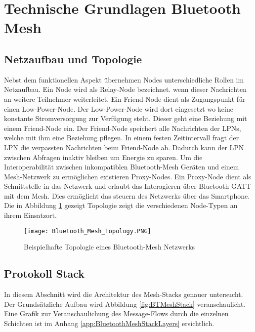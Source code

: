 \clearpage
\section{Technische Grundlagen Bluetooth Mesh}\label{sec:TechnischeGrundlagenBluetoothMesh}




\subsection{Netzaufbau und Topologie}\label{sec:NetzaufbauundTopologie}

Nebst dem funktionellen Aspekt übernehmen Nodes unterschiedliche Rollen im Netzaufbau. Ein Node wird als Relay-Node bezeichnet. wenn dieser Nachrichten an weitere Teilnehmer weiterleitet. Ein Friend-Node dient als Zugangspunkt für einen Low-Power-Node. Der Low-Power-Node wird dort eingesetzt wo keine konstante Stromversorgung zur Verfügung steht. Dieser geht eine Beziehung mit einem Friend-Node ein. Der Friend-Node speichert alle Nachrichten der LPNs, welche mit ihm eine Beziehung pflegen. In einem festen Zeitintervall fragt der LPN die verpassten Nachrichten beim Friend-Node ab. Dadurch kann der LPN zwischen Abfragen inaktiv bleiben um Energie zu sparen. Um die Interoperabilität zwischen inkompatiblen Bluetooth-Mesh Geräten und einem Mesh-Netzwerk zu ermöglichen existieren Proxy-Nodes. Ein Proxy-Node dient als Schnittstelle in das Netzwerk und erlaubt das Interagieren über Bluetooth-GATT mit dem Mesh. Dies ermöglicht das steuern des Netzwerks über das Smartphone. Die in Abbildung \ref{fig:BTMeshTopology} gezeigt Topologie zeigt die verschiedenen Node-Typen an ihrem Einsatzort. 

\begin{figure} [H]
	\centering
	\texttt{[image: Bluetooth\_Mesh\_Topology.PNG]}
	\caption{Beispielhafte Topologie eines Bluetooth-Mesh Netzwerks \cite{bluetooth_sig_mesh_netzwerk_spezifikationen_2020}} 
	\label{fig:BTMeshTopology}
\end{figure}


\subsection{Protokoll Stack}\label{sec:BLEMeshProtokollStack}
In diesem Abschnitt wird die Architektur des Mesh-Stacks genauer untersucht. Der Grundsätzliche Aufbau wird Abbildung \ref{fig:BTMeshStack} veranschaulicht. Eine Grafik zur Veranschaulichung des Message-Flows durch die einzelnen Schichten ist im Anhang \ref{app:BluetoothMeshStackLayers} ersichtlich. 

